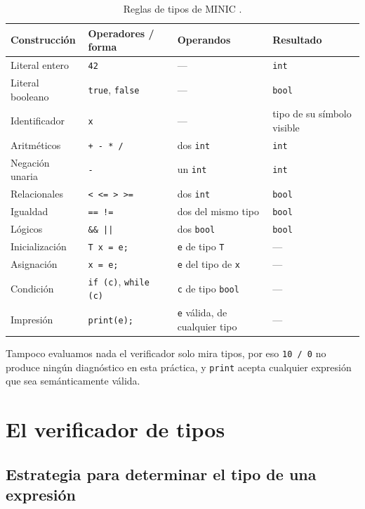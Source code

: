 \documentclass[12pt,letterpaper]{article}
\newcommand{\minic}{
  {M\footnotesize INI\normalsize C}
}
\begin{document}
\begin{table}[H]
\centering
\small
\begin{tabular}{|p{4.2cm}|p{4.6cm}|p{3.2cm}|p{3.2cm}|}
\hline
\textbf{Construcción} & \textbf{Operadores / forma} & \textbf{Operandos} & \textbf{Resultado} \\ \hline
Literal entero & \texttt{42} & --- & \texttt{int} \\ \hline
Literal booleano & \texttt{true}, \texttt{false} & --- & \texttt{bool} \\ \hline
Identificador & \texttt{x} & --- & tipo de su símbolo visible \\ \hline
Aritméticos & \texttt{+ - * /} & dos \texttt{int} & \texttt{int} \\ \hline
Negación unaria & \texttt{-} & un \texttt{int} & \texttt{int} \\ \hline
Relacionales & \texttt{< <= > >=} & dos \texttt{int} & \texttt{bool} \\ \hline
Igualdad & \texttt{==  !=} & dos del mismo tipo & \texttt{bool} \\ \hline
Lógicos & \texttt{\&\&  ||} & dos \texttt{bool} & \texttt{bool} \\ \hline
Inicialización & \texttt{T x = e;} & \texttt{e} de tipo \texttt{T} & --- \\ \hline
Asignación & \texttt{x = e;} & \texttt{e} del tipo de \texttt{x} & --- \\ \hline
Condición & \texttt{if (c)}, \texttt{while (c)} & \texttt{c} de tipo \texttt{bool} & --- \\ \hline
Impresión & \texttt{print(e);} & \texttt{e} válida, de cualquier tipo & --- \\ \hline
\end{tabular}
\caption{Reglas de tipos de \minic{}.}
\end{table}

Tampoco evaluamos nada el verificador solo mira tipos, por eso \texttt{10 / 0} no produce ningún diagnóstico en
esta práctica, y \texttt{print} acepta cualquier expresión que sea semánticamente válida.

\section*{El verificador de tipos}

\subsection*{Estrategia para determinar el tipo de una expresión}
\end{document}
